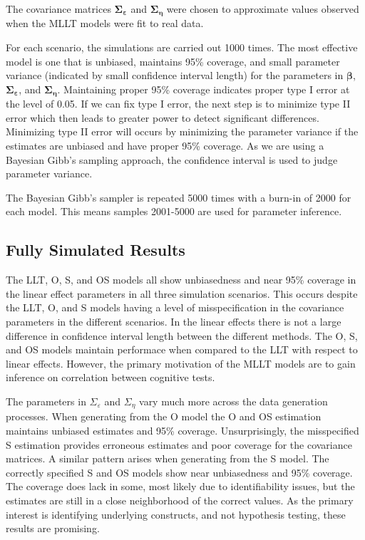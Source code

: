 \documentclass[
]{article}
\begin{document}
The covariance matrices \(\boldsymbol{\Sigma_\varepsilon}\) and \(\boldsymbol{\Sigma_\eta}\) were chosen to approximate values observed when the MLLT models were fit to real data.

For each scenario, the simulations are carried out 1000 times. The most effective model is one that is unbiased, maintains 95\% coverage, and small parameter variance (indicated by small confidence interval length) for the parameters in \(\boldsymbol{\beta}\), \(\boldsymbol{\Sigma_\varepsilon}\), and \(\boldsymbol{\Sigma_\eta}\). Maintaining proper 95\% coverage indicates proper type I error at the level of 0.05. If we can fix type I error, the next step is to minimize type II error which then leads to greater power to detect significant differences. Minimizing type II error will occurs by minimizing the parameter variance if the estimates are unbiased and have proper 95\% coverage. As we are using a Bayesian Gibb's sampling approach, the confidence interval is used to judge parameter variance.

The Bayesian Gibb's sampler is repeated 5000 times with a burn-in of 2000 for each model. This means samples 2001-5000 are used for parameter inference.

\hypertarget{fully-simulated-results}{%
\subsection{Fully Simulated Results}\label{fully-simulated-results}}

The LLT, O, S, and OS models all show unbiasedness and near 95\% coverage in the linear effect parameters in all three simulation scenarios. This occurs despite the LLT, O, and S models having a level of misspecification in the covariance parameters in the different scenarios. In the linear effects there is not a large difference in confidence interval length between the different methods. The O, S, and OS models maintain performace when compared to the LLT with respect to linear effects. However, the primary motivation of the MLLT models are to gain inference on correlation between cognitive tests.

The parameters in \(\Sigma_\varepsilon\) and \(\Sigma_\eta\) vary much more across the data generation processes. When generating from the O model the O and OS estimation maintains unbiased estimates and 95\% coverage. Unsurprisingly, the misspecified S estimation provides erroneous estimates and poor coverage for the covariance matrices. A similar pattern arises when generating from the S model. The correctly specified S and OS models show near unbiasedness and 95\% coverage. The coverage does lack in some, most likely due to identifiability issues, but the estimates are still in a close neighborhood of the correct values. As the primary interest is identifying underlying constructs, and not hypothesis testing, these results are promising.
\end{document}
